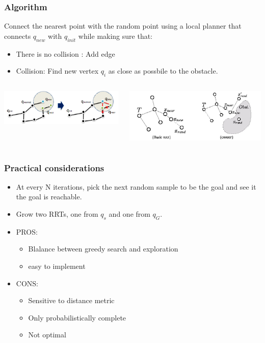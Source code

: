 \documentclass{beamer}
\begin{document}
\begin{frame}
\frametitle{Algorithm}
 Connect the nearest point with the random point using a local planner that connects $q_{new}$ with $q_{init}$ while making sure that:
\begin{itemize}
\item There is no collision : Add edge
\item Collision: Find new vertex $q_i$ as close as possbile to the obstacle.
\end{itemize}
\begin{columns}[c] 
\centering
 \includegraphics[width=.85\textwidth]{figures/rrt2.png}

\centering
 \includegraphics[width=.85\textwidth]{figures/rrt3.jpg}
\end{columns}
\end{frame}
\begin{frame}
\frametitle{Practical considerations}
\begin{itemize}
\item At every N iterations, pick the next random sample to be the goal and see it the goal is reachable. 
\item Grow two RRTs, one from $q_s$ and one from $q_G$. 
\item PROS:
\begin{itemize}
\item Blalance between greedy search and exploration
\item easy to implement
\end{itemize}
\item CONS:
\begin{itemize}
\item Sensitive to distance metric
\item Only probabilistically complete
\item Not optimal
\end{itemize}
\end{itemize}

\end{frame}
\end{document}

